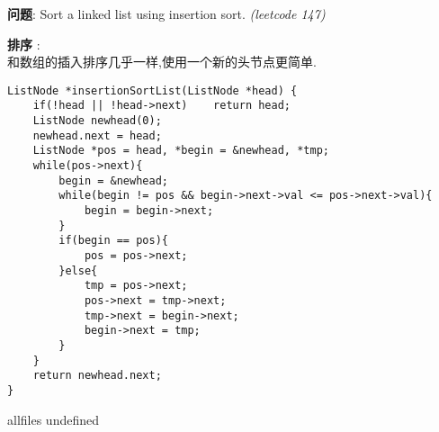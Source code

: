 \documentclass{article}
\begin{document}
\begin{CJK}{UTF8}{gbsn}     %

\else
    
\begin{description}
    \item{\textbf{问题}}: Sort a linked list using insertion sort. \textit{(leetcode 147)}
    \item{\textbf{排序}} : 
    \\和数组的插入排序几乎一样,使用一个新的头节点更简单.
    \begin{lstlisting}
ListNode *insertionSortList(ListNode *head) {
	if(!head || !head->next)	return head;
	ListNode newhead(0);
	newhead.next = head;
	ListNode *pos = head, *begin = &newhead, *tmp;
	while(pos->next){
		begin = &newhead;
		while(begin != pos && begin->next->val <= pos->next->val){
			begin = begin->next;
		}
		if(begin == pos){
			pos = pos->next;
		}else{
			tmp = pos->next;
			pos->next = tmp->next;
			tmp->next = begin->next;
			begin->next = tmp;
		}
	}
	return newhead.next;
}
    \end{lstlisting}
\end{description}

\fi

\ifx allfiles undefined
\end{CJK}
\end{document}
